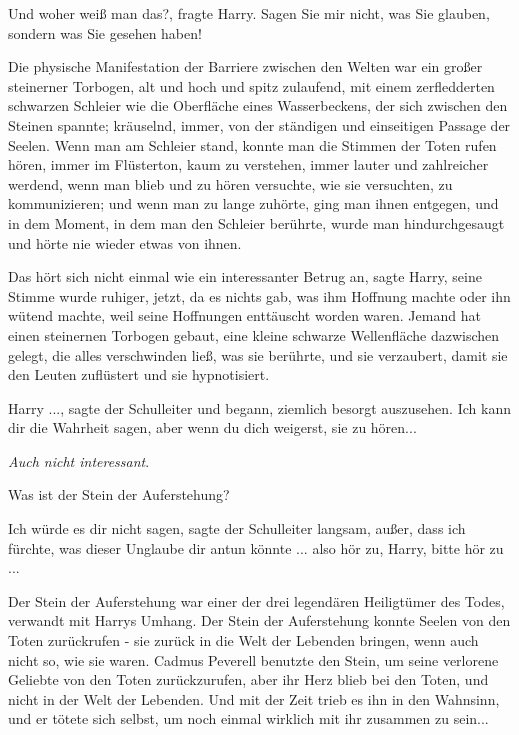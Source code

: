 \glqq{}Und woher weiß man das?\grqq{}, fragte Harry. \glqq{}Sagen Sie mir nicht,
was Sie glauben, sondern was Sie gesehen haben!\grqq{}

Die physische Manifestation der Barriere zwischen den Welten war ein großer
steinerner Torbogen, alt und hoch und spitz zulaufend, mit einem zerfledderten
schwarzen Schleier wie die Oberfläche eines Wasserbeckens, der sich zwischen den
Steinen spannte; kräuselnd, immer, von der ständigen und einseitigen Passage der
Seelen. Wenn man am Schleier stand, konnte man die Stimmen der Toten rufen
hören, immer im Flüsterton, kaum zu verstehen, immer lauter und zahlreicher
werdend, wenn man blieb und zu hören versuchte, wie sie versuchten, zu
kommunizieren; und wenn man zu lange zuhörte, ging man ihnen entgegen, und in
dem Moment, in dem man den Schleier berührte, wurde man hindurchgesaugt und
hörte nie wieder etwas von ihnen.

\glqq{}Das hört sich nicht einmal wie ein interessanter Betrug an\grqq{}, sagte
Harry, seine Stimme wurde ruhiger, jetzt, da es nichts gab, was ihm Hoffnung
machte oder ihn wütend machte, weil seine Hoffnungen enttäuscht worden waren.
\glqq{}Jemand hat einen steinernen Torbogen gebaut, eine kleine schwarze
Wellenfläche dazwischen gelegt, die alles verschwinden ließ, was sie berührte,
und sie verzaubert, damit sie den Leuten zuflüstert und sie hypnotisiert.\grqq{}

\glqq{}Harry ...\grqq{}, sagte der Schulleiter und begann, ziemlich besorgt
auszusehen. \glqq{}Ich kann dir die Wahrheit sagen, aber wenn du dich weigerst,
sie zu hören...\grqq{}

\emph{Auch nicht interessant}.

\glqq{}Was ist der Stein der Auferstehung?\grqq{}

\glqq{}Ich würde es dir nicht sagen\grqq{}, sagte der Schulleiter langsam, \glqq
außer, dass ich fürchte, was dieser Unglaube dir antun könnte ... also hör zu,
Harry, bitte hör zu ...\grqq{}

Der Stein der Auferstehung war einer der drei legendären Heiligtümer des Todes,
verwandt mit Harrys Umhang. Der Stein der Auferstehung konnte Seelen von den
Toten zurückrufen - sie zurück in die Welt der Lebenden bringen, wenn auch nicht
so, wie sie waren. Cadmus Peverell benutzte den Stein, um seine verlorene
Geliebte von den Toten zurückzurufen, aber ihr Herz blieb bei den Toten, und
nicht in der Welt der Lebenden. Und mit der Zeit trieb es ihn in den Wahnsinn,
und er tötete sich selbst, um noch einmal wirklich mit ihr zusammen zu sein...

